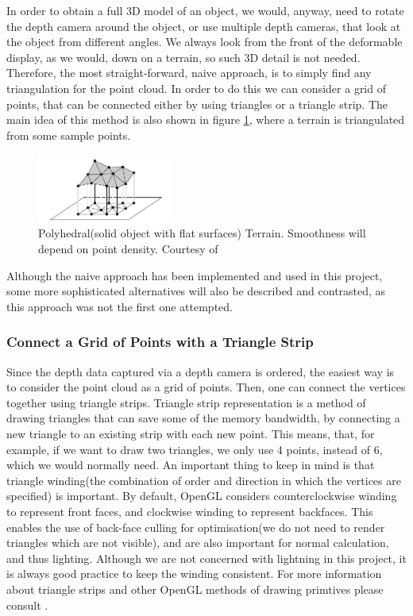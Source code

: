 \documentclass[]{article}
\begin{document}
In order to obtain a full 3D model of an object, we would, anyway, need to rotate the depth camera around the object, or use multiple depth cameras, that look at the object from different angles. We always look from the front of the deformable display, as we would, down on a terrain, so such 3D detail is not needed. Therefore, the most straight-forward, naive approach, is to simply find any triangulation for the point cloud. In order to do this we can consider a grid of points, that can be connected either by using triangles or a triangle strip. The main idea of this method is also shown in figure \ref{fig:PolyhedralTerrain.PNG}, where a terrain is triangulated from some sample points.

\begin{figure}[hbtp]
    \centering
    \includegraphics[width=0.4\textwidth]{figures/PolyhedralTerrain.PNG}
    \caption{Polyhedral(solid object with flat surfaces) Terrain. Smoothness will depend on point density. Courtesy of \cite[Chapter~9]{berg08}}
    \label{fig:PolyhedralTerrain.PNG}
\end{figure}

Although the naive approach has been implemented and used in this project, some more sophisticated alternatives will also be described and contrasted, as this approach was not the first one attempted.

\subsubsection{Connect a Grid of Points with a Triangle Strip}

Since the depth data captured via a depth camera is ordered, the easiest way is to consider the point cloud as a grid of points. Then, one can connect the vertices together using triangle strips. Triangle strip representation is a method of drawing triangles that can save some of the memory bandwidth, by connecting a new triangle to an existing strip with each new point. This means, that, for example, if we want to draw two triangles, we only use 4 points, instead of 6, which we would normally need. An important thing to keep in mind is that triangle winding(the combination of order and direction in which the vertices are specified) is important. By default, OpenGL considers counterclockwise winding to represent front faces, and clockwise winding to represent backfaces. This enables the use of back-face culling for optimisation(we do not need to render triangles which are not visible), and are also important for normal calculation, and thus lighting. Although we are not concerned with lightning in this project, it is always good practice to keep the winding consistent. For more information about triangle strips and other OpenGL methods of drawing primtives please consult \cite[Chapter~3]{superbible}.
\end{document}
